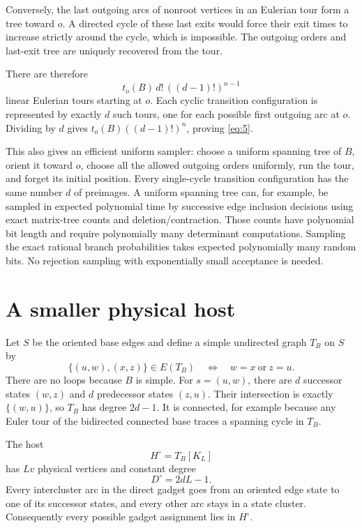 \documentclass[11pt]{article}
\theoremstyle{definition}
\theoremstyle{remark}
\numberwithin{equation}{section}
\begin{document}
Conversely, the last outgoing arcs of nonroot vertices in an
Eulerian tour form a tree toward \(o\). A directed cycle of these
last exits would force their exit times to increase strictly
around the cycle, which is impossible. The outgoing orders and
last-exit tree are uniquely recovered from the tour.

There are therefore
\[
                     t_o(B)\,d!\,((d-1)!)^{n-1}
\]
linear Eulerian tours starting at \(o\). Each cyclic transition
configuration is represented by exactly \(d\) such tours, one
for each possible first outgoing arc at \(o\). Dividing by \(d\)
gives \(t_o(B)((d-1)!)^n\), proving \eqref{eq:5}.

This also gives an efficient uniform sampler: choose a uniform
spanning tree of \(B\), orient it toward \(o\), choose all the
allowed outgoing orders uniformly, run the tour, and forget its
initial position. Every single-cycle transition configuration
has the same number \(d\) of preimages.
A uniform spanning tree can, for example, be sampled in expected
polynomial time by successive
edge inclusion decisions using exact matrix-tree counts and
deletion/contraction. Those counts have polynomial bit length
and require polynomially many determinant computations.
Sampling the exact rational branch probabilities takes expected
polynomially many random bits. No rejection sampling with
exponentially small acceptance is needed.


\section{A smaller physical host}\label{app:thin}
Let \(S\) be the oriented base edges and define a simple
undirected graph \(T_B\) on \(S\) by
\[
 \{(u,w),(x,z)\}\in E(T_B)
                 \quad\Longleftrightarrow\quad w=x\ \text{or}\ z=u.
\]
There are no loops because \(B\) is simple.
For \(s=(u,w)\), there are \(d\) successor states \((w,z)\)
and \(d\) predecessor states \((z,u)\). Their intersection
is exactly \(\{(w,u)\}\), so \(T_B\) has degree \(2d-1\).
It is connected, for example because any Euler tour of the
bidirected connected base traces a spanning cycle in \(T_B\).

The host
\[
                         H^\circ=T_B[K_L]
\]
has \(Lv\) physical vertices and constant degree
\[
                         D^\circ=2dL-1.
\]
Every intercluster arc in the direct gadget goes from an oriented
edge state to one of its successor states, and every other arc
stays in a state cluster. Consequently every possible gadget
assignment lies in \(H^\circ\).
\end{document}
